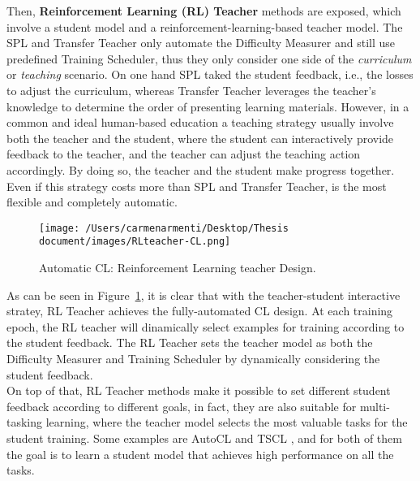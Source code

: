 Then, \textbf{Reinforcement Learning (RL) Teacher} methods are exposed, which involve a student model and a reinforcement-learning-based 
teacher model. The SPL and Transfer Teacher only automate the Difficulty Measurer and still use predefined
Training Scheduler, thus they only consider one side of the \textit{curriculum} or \textit{teaching} scenario. On one hand
SPL taked the student feedback, i.e., the losses to adjust the curriculum, whereas Transfer Teacher leverages the teacher's knowledge
to determine the order of presenting learning materials. However, in a common and ideal human-based education a teaching strategy
usually involve both the teacher and the student, where the student can interactively provide feedback to the teacher, and the teacher 
can adjust the teaching action accordingly. By doing so, the teacher and the student make progress together.
Even if this strategy costs more than SPL and Transfer Teacher, is the most flexible and completely automatic.
\begin{figure}[h]
    \begin{center}
        \texttt{[image: /Users/carmenarmenti/Desktop/Thesis document/images/RLteacher-CL.png]}
        \caption{\label{fig:RLteacher-CL}Automatic CL: Reinforcement Learning teacher Design.}
    \end{center}
\end{figure}
As can be seen in Figure~\ref{fig:RLteacher-CL}, it is clear that with the teacher-student interactive
stratey, RL Teacher achieves the fully-automated CL design. At each training epoch, the RL teacher
will dinamically select examples for training according to the student feedback. The RL Teacher 
sets the teacher model as both the Difficulty Measurer and Training Scheduler by dynamically considering 
the student feedback.\\
On top of that, RL Teacher methods make it possible to set different student feedback according 
to different goals, in fact, they are also suitable for multi-tasking learning, where the teacher model 
selects the most valuable tasks for the student training. Some examples are AutoCL \cite{graves2017automated} and TSCL \cite{matiisen2019teacher}, and for both of them the goal is 
to learn a student model that achieves high performance on all the tasks.

